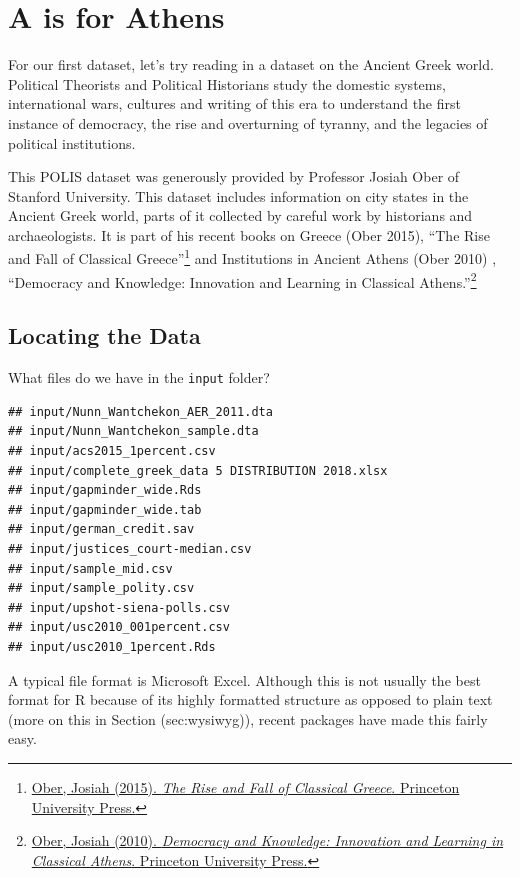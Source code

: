 \documentclass[]{book}
\let\rmarkdownfootnote\footnote%
\def\footnote{\protect\rmarkdownfootnote}
\theoremstyle{definition}
\theoremstyle{definition}
\theoremstyle{definition}
\theoremstyle{remark}
\begin{document}
\hypertarget{a-is-for-athens}{%
\section{A is for Athens}\label{a-is-for-athens}}

For our first dataset, let's try reading in a dataset on the Ancient Greek world. Political Theorists and Political Historians study the domestic systems, international wars, cultures and writing of this era to understand the first instance of democracy, the rise and overturning of tyranny, and the legacies of political institutions.

This POLIS dataset was generously provided by Professor Josiah Ober of Stanford University. This dataset includes information on city states in the Ancient Greek world, parts of it collected by careful work by historians and archaeologists. It is part of his recent books on Greece (Ober 2015), ``The Rise and Fall of Classical Greece''\footnote{\href{https://press.princeton.edu/titles/10423.html}{Ober, Josiah (2015). \emph{The Rise and Fall of Classical Greece}. Princeton University Press.}} and Institutions in Ancient Athens (Ober 2010) , ``Democracy and Knowledge: Innovation and Learning in Classical Athens.''\footnote{\href{https://press.princeton.edu/titles/8742.html}{Ober, Josiah (2010). \emph{Democracy and Knowledge: Innovation and Learning in Classical Athens}. Princeton University Press.}}

\hypertarget{locating-the-data}{%
\subsection{Locating the Data}\label{locating-the-data}}

What files do we have in the \texttt{input} folder?

\begin{verbatim}
## input/Nunn_Wantchekon_AER_2011.dta
## input/Nunn_Wantchekon_sample.dta
## input/acs2015_1percent.csv
## input/complete_greek_data 5 DISTRIBUTION 2018.xlsx
## input/gapminder_wide.Rds
## input/gapminder_wide.tab
## input/german_credit.sav
## input/justices_court-median.csv
## input/sample_mid.csv
## input/sample_polity.csv
## input/upshot-siena-polls.csv
## input/usc2010_001percent.csv
## input/usc2010_1percent.Rds
\end{verbatim}

A typical file format is Microsoft Excel. Although this is not usually the best format for R because of its highly formatted structure as opposed to plain text (more on this in Section (sec:wysiwyg)), recent packages have made this fairly easy.
\end{document}
